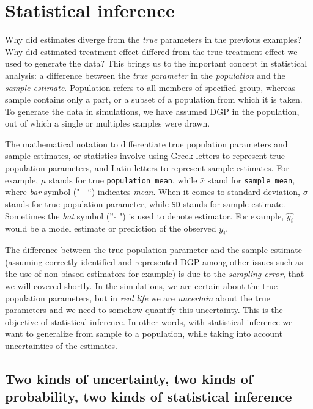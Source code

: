 \documentclass[
]{book}
\begin{document}
\hypertarget{statistical-inference}{%
\chapter{Statistical inference}\label{statistical-inference}}

Why did estimates diverge from the \emph{true} parameters in the previous examples? Why did estimated treatment effect differed from the true treatment effect we used to generate the data? This brings us to the important concept in statistical analysis: a difference between the \emph{true parameter} in the \emph{population} and the \emph{sample estimate}. Population refers to all members of specified group, whereas sample contains only a part, or a subset of a population from which it is taken. To generate the data in simulations, we have assumed DGP in the population, out of which a single or multiples samples were drawn.

The mathematical notation to differentiate true population parameters and sample estimates, or statistics involve using Greek letters to represent true population parameters, and Latin letters to represent sample estimates. For example, \(\mu\) stands for true \texttt{population\ mean}, while \(\bar{x}\) stand for \texttt{sample\ mean}, where \emph{bar} symbol (" \(\bar{}\) ``) indicates \emph{mean}. When it comes to standard deviation, \(\sigma\) stands for true population parameter, while \texttt{SD} stands for sample estimate. Sometimes the \emph{hat} symbol ('' \(\hat{}\) ") is used to denote estimator. For example, \(\hat{y_i}\) would be a model estimate or prediction of the observed \(y_i\).

The difference between the true population parameter and the sample estimate (assuming correctly identified and represented DGP among other issues such as the use of non-biased estimators for example) is due to the \emph{sampling error}, that we will covered shortly. In the simulations, we are certain about the true population parameters, but in \emph{real life} we are \emph{uncertain} about the true parameters and we need to somehow quantify this uncertainty. This is the objective of statistical inference. In other words, with statistical inference we want to generalize from sample to a population, while taking into account uncertainties of the estimates.

\hypertarget{two-kinds-of-uncertainty-two-kinds-of-probability-two-kinds-of-statistical-inference}{%
\section{Two kinds of uncertainty, two kinds of probability, two kinds of statistical inference}\label{two-kinds-of-uncertainty-two-kinds-of-probability-two-kinds-of-statistical-inference}}
\end{document}
